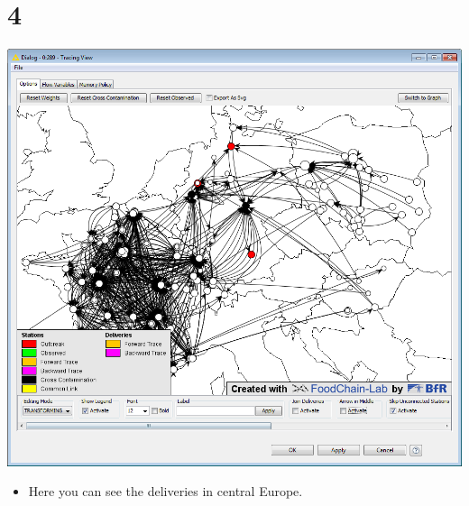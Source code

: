 \documentclass{beamer}
\begin{document}
\section{4}
\begin{frame}
	\begin{center}
  		\includegraphics[height=0.6\textheight]{4.png}
	\end{center}
	\begin{itemize}
		\item Here you can see the deliveries in central Europe.
	\end{itemize}
\end{frame}
\end{document}
